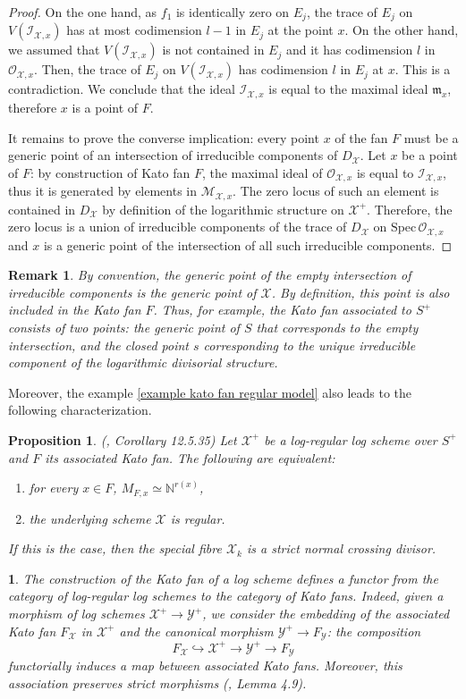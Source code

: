 \documentclass{amsart}%
\numberwithin{equation}{subsection}
\theoremstyle{plain2}
\newtheorem{prop}[equation]{Proposition}
\theoremstyle{definition2}
\newtheorem{rem}[equation]{Remark}
\theoremstyle{stepstyle}
\theoremstyle{point}
\theoremstyle{subpoint}
\newtheorem{subpoint}[equation]{}%
\newcommand{\spa}[1]{\begin{subpoint}#1\end{subpoint}}           %
\newcommand{\N}{\ensuremath{\mathbb{N}}}
\newcommand{\cX}{\ensuremath{\mathscr{X}}}
\newcommand{\caO}{\ensuremath{\mathcal{O}}}
\newcommand{\caI}{\ensuremath{\mathcal{I}}}
\newcommand{\cY}{\ensuremath{\mathscr{Y}}}
\renewcommand{\cY}{\ensuremath{\mathscr{Y}}}
\newcommand{\Spec}{\ensuremath{\mathrm{Spec}\,}}
\begin{document}
\begin{proof}
On the one hand, as $f_1$ is identically zero on $E_j$, the trace of $E_j$ on $V(\caI_{\cX,x})$ has at most codimension $l-1$ in $E_j$ at the point $x$. On the other hand, we assumed that $V(\caI_{\cX,x})$ is not contained in $E_j$ and it has codimension $l$ in $\caO_{\cX,x}$. Then, the trace of $E_j$ on $V(\caI_{\cX,x})$ has codimension $l$ in $E_j$ at $x$. This is a contradiction. We conclude that the ideal $\caI_{\cX,x}$ is equal to the maximal ideal $\mathfrak{m}_x$, therefore $x$ is a point of $F$.

It remains to prove the converse implication: every point $x$ of the fan $F$ must be a generic point of an intersection of irreducible components of $D_{\cX}$. Let $x$ be a point of $F$: by construction of Kato fan $F$, the maximal ideal of $\mathcal{O}_{\cX,x}$ is equal to $\mathcal{I}_{\cX,x}$, thus it is generated by elements in $\mathcal{M}_{\cX,x}$. The zero locus of such an element is contained in $D_{\cX}$ by definition of the logarithmic structure on $\cX^+$. Therefore, the zero locus is a union of irreducible components of the trace of $D_{\cX}$ on $\Spec \mathcal{O}_{\cX,x}$ and $x$ is a generic point of the intersection of all such irreducible components.
\end{proof}

\begin{rem}
By convention, the generic point of the empty intersection of irreducible components is the generic point of $\cX$. By definition, this point is also included in the Kato fan $F$. Thus, for example, the Kato fan associated to $S^+$ consists of two points: the generic point of $S$ that corresponds to the empty intersection, and the closed point $s$ corresponding to the unique irreducible component of the logarithmic divisorial structure.  
\end{rem}

Moreover, the example \ref{example kato fan regular model} also leads to the following characterization.

\begin{prop} \label{resolution log scheme kato fan} (\cite{GabberRamero}, Corollary 12.5.35)
Let $\cX^+$ be a log-regular log scheme over $S^+$ and $F$ its associated Kato fan. The following are equivalent: \begin{enumerate}
\item for every $x \in F$, $M_{F,x} \simeq \N^{r(x)}$,
\item the underlying scheme $\cX$ is regular.
\end{enumerate}
If this is the case, then the special fibre $\cX_k$ is a strict normal crossing divisor.
\end{prop}
\spa{The construction of the Kato fan of a log scheme defines a functor from the category of log-regular log schemes to the category of Kato fans. Indeed, given a morphism of log schemes $\cX^+ \rightarrow \cY^+$, we consider the embedding of the associated Kato fan $F_{\cX}$ in $\cX^+$ and the canonical morphism $\cY^+ \rightarrow F_{\cY}$: the composition $$F_{\cX} \hookrightarrow \cX^+ \rightarrow \cY^+ \rightarrow F_\cY$$ functorially induces a map between associated Kato fans. Moreover, this association preserves strict morphisms (\cite{Ulirsch2013}, Lemma 4.9).}
\end{document}
